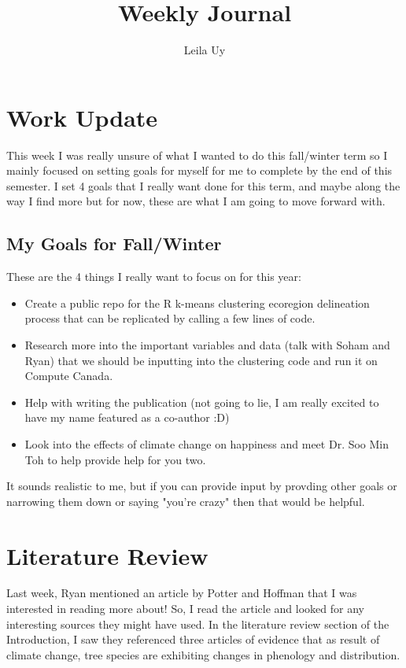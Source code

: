 \documentclass[a4paper,10pt]{article}
\title{Weekly Journal}
\author{Leila Uy}
\begin{document}
\maketitle

% 

\section{Work Update}
This week I was really unsure of what I wanted to do this fall/winter term so I mainly focused on setting goals for myself for me to complete by the end of this semester. I set 4 goals that I really want done for this term, and maybe along the way I find more but for now, these are what I am going to move forward with.


\subsection{My Goals for Fall/Winter}
These are the 4 things I really want to focus on for this year:

\begin{itemize}
    \item Create a public repo for the R k-means clustering ecoregion delineation process that can be replicated by calling a few lines of code.
    \item Research more into the important variables and data (talk with Soham and Ryan) that we should be inputting into the clustering code and run it on Compute Canada.
    \item Help with writing the publication (not going to lie, I am really excited to have my name featured as a co-author :D)
    \item Look into the effects of climate change on happiness and meet Dr. Soo Min Toh to help provide help for you two. 
\end{itemize}
It sounds realistic to me, but if you can provide input by provding other goals or narrowing them down or saying "you're crazy" then that would be helpful.

\section{Literature Review}
Last week, Ryan mentioned an article by Potter and Hoffman \cite{potter2012determining} that I was interested in reading more about! So, I read the article and looked for any interesting sources they might have used. In the literature review section of the Introduction, I saw they referenced three articles of evidence that as result of climate change, tree species are exhibiting changes in phenology and distribution. 
\end{document}
